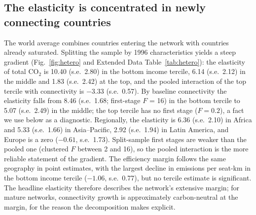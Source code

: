 \documentclass[12pt]{article}
\begin{document}
\subsection*{The elasticity is concentrated in newly connecting countries}
The world average combines countries entering the network with countries
already saturated. Splitting the sample by 1996 characteristics yields a
steep gradient (Fig.~\ref{fig:hetero} and Extended Data
Table~\ref{tab:hetero}): the elasticity of total CO$_2$ is 10.40 (s.e.\
2.80) in the bottom income tercile, 6.14 (s.e.\ 2.12) in the middle and
1.83 (s.e.\ 2.42) at the top, and the pooled interaction of the top
tercile with connectivity is $-3.33$ (s.e.\ 0.57). By baseline
connectivity the elasticity falls from 8.46 (s.e.\ 1.68; first-stage $F$ =
16) in the bottom tercile to 5.07 (s.e.\ 2.49) in the middle; the top
tercile has no first stage ($F = 0.2$), a fact we use below as a
diagnostic. Regionally, the elasticity is 6.36 (s.e.\ 2.10) in Africa and
5.33 (s.e.\ 1.66) in Asia--Pacific, 2.92 (s.e.\ 1.94) in Latin America,
and Europe is a zero ($-0.61$, s.e.\ 1.73). Split-sample first stages are
weaker than the pooled one (clustered $F$ between 2 and 16), so the pooled
interaction is the more reliable statement of the gradient. The efficiency
margin follows the same geography in point estimates, with the largest
decline in emissions per seat-km in the bottom income tercile ($-1.06$,
s.e.\ 0.77), but no tercile estimate is significant. The headline elasticity therefore describes
the network's extensive margin; for mature networks, connectivity growth is
approximately carbon-neutral at the margin, for the reason the
decomposition makes explicit.
\end{document}
